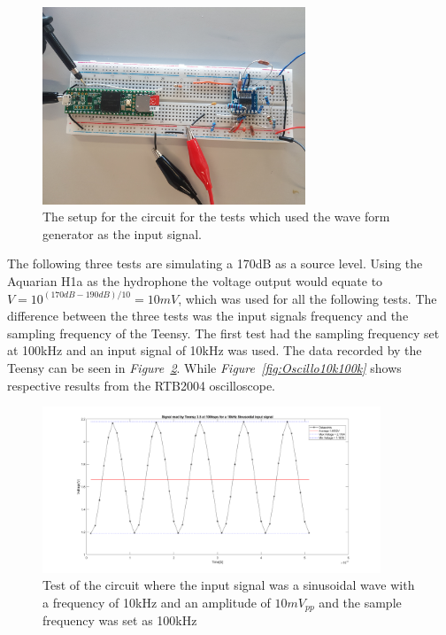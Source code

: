 \begin{figure}[h]
    \centering
    \includegraphics[width=0.7\textwidth]{graphics/TestSetup.jpg}
    \caption{The setup for the circuit for the tests which used the wave form generator as the input signal.}
    \label{fig:testCircSetup}
\end{figure}


The following three tests are simulating a 170dB as a source level.
Using the Aquarian H1a as the hydrophone the voltage output would equate to  $V = 10^{(170dB-190dB)/10} = 10mV$, which was used for all the following tests.
The difference between the three tests was the input signals frequency and the sampling frequency of the Teensy.
The first test had the sampling frequency set at 100kHz and an input signal of 10kHz was used.
The data recorded by the Teensy can be seen in \textit{Figure~\ref{fig:Teensy10k100k}}.
While \textit{Figure~\ref{fig:Oscillo10k100k}} shows respective results from the RTB2004 oscilloscope.

\begin{figure}[h]
    \centering
    \includegraphics[width=0.9\textwidth]{graphics/10kin_100ksampl.png}
    \caption{Test of the circuit where the input signal was a sinusoidal wave with a frequency of 10kHz and an amplitude of $10mV_{pp}$ and the sample frequency was set as 100kHz}
    \label{fig:Teensy10k100k}
\end{figure}

